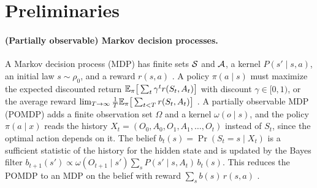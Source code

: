 
\section[Preliminaries]{Preliminaries}\label{sec:prelim}


\paragraph{(Partially observable) Markov decision processes.}
A Markov decision process (MDP) has finite sets $\mathcal S$ and $\mathcal A$, a kernel $P(s' \mid s,a)$, an initial law $s \sim \rho_0$, and a reward $r(s,a)$ \citep{Puterman-markov94}.
A policy $\pi(a \mid s)$ must maximize the expected discounted return $\mathbb E_\pi\big[\sum_{t} \gamma^t r(S_t,A_t)\big]$ with discount $\gamma \in [0, 1)$, or the average reward $\lim_{T \to \infty} \frac1T \mathbb E_\pi\big[\sum_{t<T} r(S_t,A_t)\big]$ \citep{Mahadevan-average96}.
A partially observable MDP (POMDP) adds a finite observation set $\Omega$ and a kernel $\omega(o \mid s)$, and the policy $\pi(a \mid x)$ reads the history $X_t = (O_0, A_0, O_1, A_1, \ldots, O_t)$ instead of $S_t$, since the optimal action depends on it.
The belief $b_t(s) = \Pr(S_t = s \mid X_t)$ is a sufficient statistic of the history for the hidden state and is updated by the Bayes filter $b_{t+1}(s') \propto \omega(O_{t+1} \mid s') \sum_s P(s' \mid s, A_t)\, b_t(s)$. %
This reduces the POMDP to an MDP on the belief with reward $\sum_s b(s)\, r(s,a)$ \citep{Kaelbling-planning98}.


